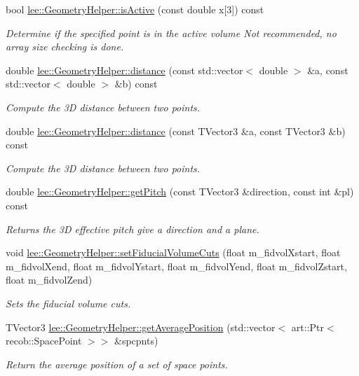 \begin{DoxyCompactItemize}
bool \hyperlink{group__lee_gab5c3e840d748f5c5340315b6c096e7c8}{lee\-::\-Geometry\-Helper\-::is\-Active} (const double x\mbox{[}3\mbox{]}) const 
\begin{DoxyCompactList}\small\item\em Determine if the specified point is in the active volume Not recommended, no array size checking is done. \end{DoxyCompactList}\item 
double \hyperlink{group__lee_ga15984c2f8c26a4bb9578835bedd19537}{lee\-::\-Geometry\-Helper\-::distance} (const std\-::vector$<$ double $>$ \&a, const std\-::vector$<$ double $>$ \&b) const 
\begin{DoxyCompactList}\small\item\em Compute the 3\-D distance between two points. \end{DoxyCompactList}\item 
double \hyperlink{group__lee_ga481ad8eed3b9842a114cce96c73fb02e}{lee\-::\-Geometry\-Helper\-::distance} (const T\-Vector3 \&a, const T\-Vector3 \&b) const 
\begin{DoxyCompactList}\small\item\em Compute the 3\-D distance between two points. \end{DoxyCompactList}\item 
double \hyperlink{group__lee_ga02f688ef51442c37a5440d45cfad799f}{lee\-::\-Geometry\-Helper\-::get\-Pitch} (const T\-Vector3 \&direction, const int \&pl) const 
\begin{DoxyCompactList}\small\item\em Returns the 3\-D effective pitch give a direction and a plane. \end{DoxyCompactList}\item 
void \hyperlink{group__lee_ga5b67d6d907f9fca0e16ccd9dba85eb54}{lee\-::\-Geometry\-Helper\-::set\-Fiducial\-Volume\-Cuts} (float m\-\_\-fidvol\-Xstart, float m\-\_\-fidvol\-Xend, float m\-\_\-fidvol\-Ystart, float m\-\_\-fidvol\-Yend, float m\-\_\-fidvol\-Zstart, float m\-\_\-fidvol\-Zend)
\begin{DoxyCompactList}\small\item\em Sets the fiducial volume cuts. \end{DoxyCompactList}\item 
T\-Vector3 \hyperlink{group__lee_ga1a7546e5a4c1693a9366126ac6c63ba9}{lee\-::\-Geometry\-Helper\-::get\-Average\-Position} (std\-::vector$<$ art\-::\-Ptr$<$ recob\-::\-Space\-Point $>$$>$ \&spcpnts)
\begin{DoxyCompactList}\small\item\em Return the average position of a set of space points. \end{DoxyCompactList}\item 
$$
\end{DoxyCompactItemize}
